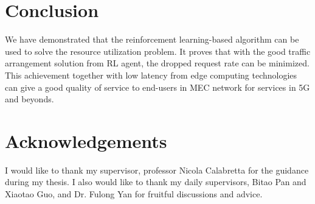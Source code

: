 \documentclass[conference]{IEEEtran}
\begin{document}


\section{Conclusion}
\label{sec:Conclusion}

We have demonstrated that the reinforcement learning-based algorithm can be used to solve the resource utilization problem. It proves that with the good traffic arrangement solution from RL agent, the dropped request rate can be minimized. This achievement together with low latency from edge computing technologies can give a good quality of service to end-users in MEC network for services in 5G and beyonds.


\section{Acknowledgements}
\label{sec:Acknowledgement}

I would like to thank my supervisor, professor Nicola Calabretta for the guidance during my thesis. I also would like to thank my daily supervisors, Bitao Pan and Xiaotao Guo, and Dr. Fulong Yan for fruitful discussions and advice. 





\end{document}
